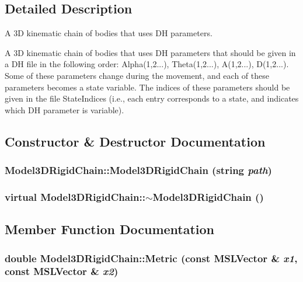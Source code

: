 \subsection{Detailed Description}
A 3D kinematic chain of bodies that uses DH parameters.

A 3D kinematic chain of bodies that uses DH parameters that should be given in a DH file in the following order: Alpha(1,2...), Theta(1,2...), A(1,2...), D(1,2...). Some of these parameters change during the movement, and each of these parameters becomes a state variable. The indices of these parameters should be given in the file State\-Indices (i.e., each entry corresponds to a state, and indicates which DH parameter is variable). 



\subsection{Constructor \& Destructor Documentation}
\subsubsection{\setlength{\rightskip}{0pt plus 5cm}Model3DRigid\-Chain::Model3DRigid\-Chain (string {\em path})}\label{classModel3DRigidChain_a0}


\subsubsection{\setlength{\rightskip}{0pt plus 5cm}virtual Model3DRigid\-Chain::$\sim$Model3DRigid\-Chain ()\hspace{0.3cm}{\tt  [inline, virtual]}}\label{classModel3DRigidChain_a1}




\subsection{Member Function Documentation}
\subsubsection{\setlength{\rightskip}{0pt plus 5cm}double Model3DRigid\-Chain::Metric (const {\bf MSLVector} \& {\em x1}, const {\bf MSLVector} \& {\em x2})\hspace{0.3cm}{\tt  [virtual]}}\label{classModel3DRigidChain_a4}


